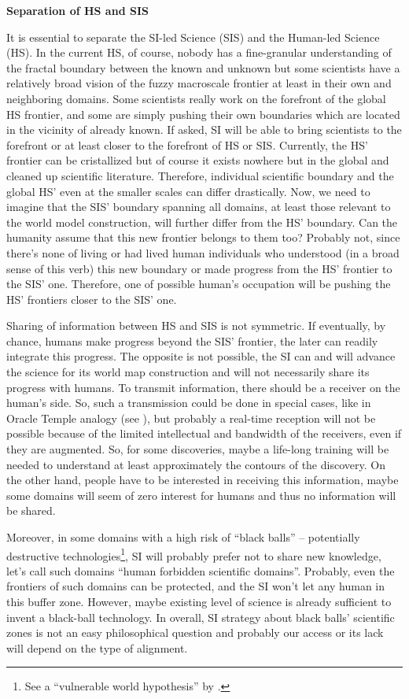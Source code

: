 \documentclass[a4paper,11pt]{article}
\begin{document}
\textbf{Separation of HS and SIS}

It is essential to separate the SI-led Science (SIS) and the Human-led Science (HS). In the current HS, of course, nobody has a fine-granular understanding of the fractal boundary between the known and unknown but some scientists have a relatively broad vision of the fuzzy macroscale frontier at least in their own and neighboring domains. Some scientists really work on the forefront of the global HS frontier, and some are simply pushing their own boundaries which are located in the vicinity of already known. If asked, SI will be able to bring scientists to the forefront or at least closer to the forefront of HS or SIS. Currently, the HS' frontier can be cristallized but of course it exists nowhere but in the global and cleaned up scientific literature. Therefore, individual scientific boundary and the global HS' even at the smaller scales can differ drastically. Now, we need to imagine that the SIS' boundary spanning all domains, at least those relevant to the world model construction, will further differ from the HS' boundary. Can the humanity assume that this new frontier belongs to them too? Probably not, since there's none of living or had lived human individuals who understood (in a broad sense of this verb) this new boundary or made progress from the HS' frontier to the SIS' one. Therefore, one of possible human's occupation will be pushing the HS' frontiers closer to the SIS' one.

Sharing of information between HS and SIS is not symmetric. If eventually, by chance, humans make progress beyond the SIS' frontier, the later can readily integrate this progress. The opposite is not possible, the SI can and will advance the science for its world map construction and will not necessarily share its progress with humans. To transmit information, there should be a receiver on the human's side. So, such a transmission could be done in special cases, like in Oracle Temple analogy (see ), but probably a real-time reception will not be possible because of the limited intellectual and bandwidth of the receivers, even if they are augmented. So, for some discoveries, maybe a life-long training will be needed to understand at least approximately the contours of the discovery. On the other hand, people have to be interested in receiving this information, maybe some domains will seem of zero interest for humans and thus no information will be shared. 

Moreover, in some domains with a high risk of ``black balls'' -- potentially destructive technologies\footnote{See a ``vulnerable world hypothesis'' by \textcite{VulnerableWorldHypothesis}.}, SI will probably prefer not to share new knowledge, let's call such domains ``human forbidden scientific domains''. Probably, even the frontiers of such domains can be protected, and the SI won't let any human in this buffer zone. However, maybe existing level of science is already sufficient to invent a black-ball technology. In overall, SI strategy about black balls' scientific zones is not an easy philosophical question and probably our access or its lack will depend on the type of alignment. 
\end{document}
